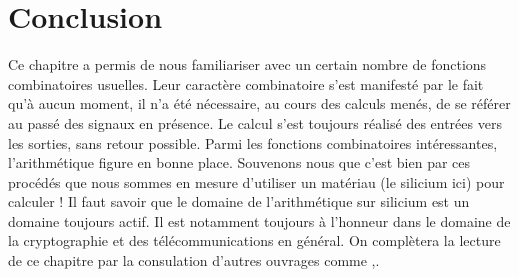 \section{Conclusion}
Ce chapitre a permis de nous familiariser avec un certain nombre de fonctions combinatoires usuelles. Leur caractère combinatoire s'est manifesté par le fait qu'à aucun moment, il n'a été nécessaire, au cours
des calculs menés, de se référer au passé des signaux en présence. Le calcul s'est toujours réalisé des entrées vers les sorties, sans retour possible.
Parmi les fonctions combinatoires intéressantes, l'arithmétique figure en bonne place. Souvenons nous que c'est bien par ces procédés que nous sommes en mesure
d'utiliser un matériau (le silicium ici) pour calculer ! Il faut savoir que le domaine de l'arithmétique sur silicium est un domaine toujours actif. Il est notamment
toujours à l'honneur dans le domaine de la cryptographie et des télécommunications en général.
On complètera la lecture de ce chapitre par la consulation d'autres ouvrages comme \cite{mano},\cite{clements}.
